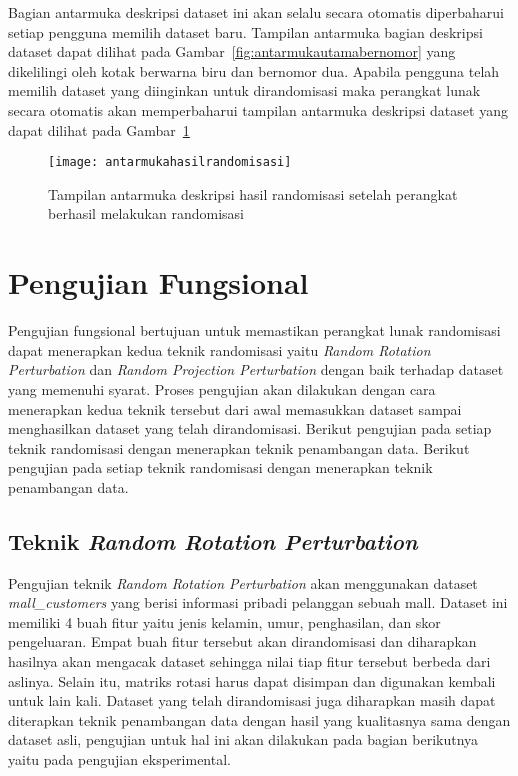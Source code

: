 Bagian antarmuka deskripsi dataset ini akan selalu secara otomatis diperbaharui setiap pengguna memilih dataset baru. Tampilan antarmuka bagian deskripsi dataset dapat dilihat pada Gambar~\ref{fig:antarmukautamabernomor} yang dikelilingi oleh kotak berwarna biru dan bernomor dua. Apabila pengguna telah memilih dataset yang diinginkan untuk dirandomisasi maka perangkat lunak secara otomatis akan memperbaharui tampilan antarmuka deskripsi dataset yang dapat dilihat pada Gambar~\ref{fig:antarmukahasilrandomisasi}

\begin{figure}
	\centering
	\texttt{[image: antarmukahasilrandomisasi]}
	\caption{Tampilan antarmuka deskripsi hasil randomisasi setelah perangkat berhasil melakukan randomisasi}
	\label{fig:antarmukahasilrandomisasi}
\end{figure}

\section{Pengujian Fungsional}
\label{sec:pengujianfungsional}

Pengujian fungsional bertujuan untuk memastikan perangkat lunak randomisasi dapat menerapkan kedua teknik randomisasi yaitu \textit{Random Rotation Perturbation} dan \textit{Random Projection Perturbation} dengan baik terhadap dataset yang memenuhi syarat. Proses pengujian akan dilakukan dengan cara menerapkan kedua teknik tersebut dari awal memasukkan dataset sampai menghasilkan dataset yang telah dirandomisasi. Berikut pengujian pada setiap teknik randomisasi dengan menerapkan teknik penambangan data. Berikut pengujian pada setiap teknik randomisasi dengan menerapkan teknik penambangan data.

\subsection{Teknik \textit{Random Rotation Perturbation}}
\label{sec:rrp-fungsional}

Pengujian teknik \textit{Random Rotation Perturbation} akan menggunakan dataset \textit{mall\_customers} yang berisi informasi pribadi pelanggan sebuah mall. Dataset ini memiliki 4 buah fitur yaitu jenis kelamin, umur, penghasilan, dan skor pengeluaran. Empat buah fitur tersebut akan dirandomisasi dan diharapkan hasilnya akan mengacak dataset sehingga nilai tiap fitur tersebut berbeda dari aslinya. Selain itu, matriks rotasi harus dapat disimpan dan digunakan kembali untuk lain kali. Dataset yang telah dirandomisasi juga diharapkan masih dapat diterapkan teknik penambangan data dengan hasil yang kualitasnya sama dengan dataset asli, pengujian untuk hal ini akan dilakukan pada bagian berikutnya yaitu pada pengujian eksperimental.

